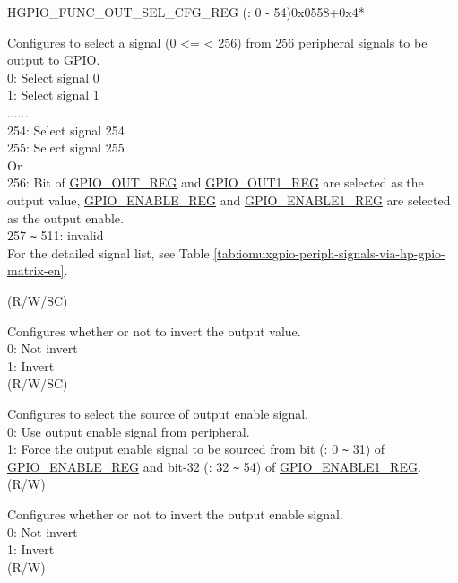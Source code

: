 \begin{register}{H}{GPIO\_FUNC\_OUT\_SEL\_CFG\_REG (: 0 - 54)}{0x0558+0x4*}\label{regdesc:GPIOFUNCNOUTSELCFGREG}
%
%
%
%
%
\regnewline%
\begin{regdesc}\begin{reglist}
\label{fielddesc:GPIOFUNCNOUTSEL}\item [GPIO\_FUNC\regindex{n}\_OUT\_SEL] Configures to select a signal  (0 <=  < 256) from 256 peripheral signals to be output to GPIO.\\
0: Select signal 0\\
1: Select signal 1\\
......\\
254: Select signal 254\\
255: Select signal 255\\
Or\\
256: Bit of \hyperref[regdesc:GPIOOUTREG]{GPIO\_OUT\_REG} and \hyperref[regdesc:GPIOOUT1REG]{GPIO\_OUT1\_REG} are selected as the output value, \hyperref[regdesc:GPIOENABLEREG]{GPIO\_ENABLE\_REG} and \hyperref[regdesc:GPIOENABLE1REG]{GPIO\_ENABLE1\_REG} are selected as the output enable.\\
257 \verb+~+ 511: invalid\\
For the detailed signal list, see Table \ref{tab:iomuxgpio-periph-signals-via-hp-gpio-matrix-en}.

(R/W/SC)
\label{fielddesc:GPIOFUNCNOUTINVSEL}\item [GPIO\_FUNC\regindex{n}\_OUT\_INV\_SEL] Configures whether or not to invert the output value.\\
0: Not invert\\
1: Invert\\ (R/W/SC)
\label{fielddesc:GPIOFUNCNOESEL}\item [GPIO\_FUNC\regindex{n}\_OE\_SEL] Configures to select the source of output enable signal.\\
0: Use output enable signal from peripheral.\\
1: Force the output enable signal to be sourced from bit (: 0 \verb+~+ 31) of \hyperref[regdesc:GPIOENABLEREG]{GPIO\_ENABLE\_REG} and bit-32 (: 32 \verb+~+ 54) of \hyperref[regdesc:GPIOENABLE1REG]{GPIO\_ENABLE1\_REG}. \\(R/W)
\label{fielddesc:GPIOFUNCNOEINVSEL}\item [GPIO\_FUNC\regindex{n}\_OE\_INV\_SEL] Configures whether or not to invert the output enable signal.\\
0: Not invert\\
1: Invert\\ (R/W)
\end{reglist}\end{regdesc}
\end{register}


